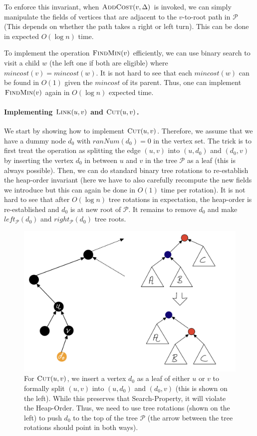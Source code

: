 To enforce this invariant, when $\textsc{AddCost}(v, \Delta)$ is invoked, we can simply manipulate the fields of vertices that are adjacent to the $v$-to-root path in $\mathcal{P}$ (This depends on whether the path takes a right or left turn). This can be done in expected $O(\log n)$ time.

To implement the operation $\textsc{FindMin}(v)$ efficiently, we can use binary search to visit a child $w$ (the left one if both are eligible) where $mincost(v) = mincost(w)$. It is not hard to see that each $mincost(w)$ can be found in $O(1)$ given the $mincost$ of its parent. Thus, one can implement $\textsc{FindMin}(v)$ again in $O(\log n)$ expected time.

\paragraph{Implementing $\textsc{Link}(u,v)$ and $\textsc{Cut}(u,v)$.} We start by showing how to implement $\textsc{Cut}(u,v)$. Therefore, we assume that we have a dummy node $d_0$ with $ranNum(d_0) = 0$ in the vertex set. The trick is to first treat the operation as splitting the edge $(u,v)$ into $(u,d_0)$ and $(d_0,v)$ by inserting the vertex $d_0$ in between $u$ and $v$ in the tree $\mathcal{P}$ as a leaf (this is always possible). Then, we can do standard binary tree rotations to re-establish the heap-order invariant (here we have to also carefully recompute the new fields we introduce but this can again be done in $O(1)$ time per rotation). It is not hard to see that after $O(\log n)$ tree rotations in expectation, the heap-order is re-established and $d_0$ is at new root of $\mathcal{P}$. It remains to remove $d_0$ and make $left_{\mathcal{P}}(d_0)$ and $right_{\mathcal{P}}(d_0)$ tree roots.

\begin{figure}[!ht]
    \centering
    \includegraphics[scale=0.2]{./fig/PathCutOperation_lectureDynamicTree.jpeg}
    \caption{For $\textsc{Cut}(u,v)$, we insert a vertex $d_0$ as a leaf of either $u$ or $v$ to formally split $(u,v)$ into $(u,d_0)$ and $(d_0,v)$ (this is shown on the left). While this preserves that Search-Property, it will violate the Heap-Order. Thus, we need to use tree rotations (shown on the left) to push $d_0$ to the top of the tree $\mathcal{P}$ (the arrow between the tree rotations should point in both ways).}
\end{figure}

